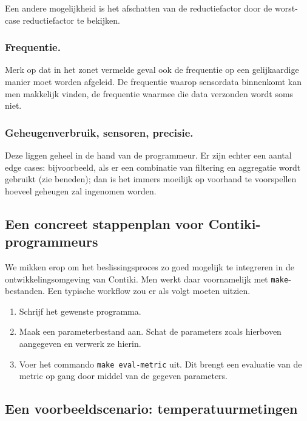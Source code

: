 \documentclass[11pt]{article}
\begin{document}
Een andere mogelijkheid is het afschatten van de reductiefactor door de
worst-case reductiefactor te bekijken.

\subsubsection{Frequentie.} Merk op dat in het zonet vermelde geval ook de
frequentie op een gelijkaardige manier moet worden afgeleid. De frequentie
waarop sensordata binnenkomt kan men makkelijk vinden, de frequentie waarmee die
data verzonden wordt soms niet. 

\subsubsection{Geheugenverbruik, sensoren, precisie.} Deze liggen geheel in de
hand van de programmeur. Er zijn echter een aantal edge cases: bijvoorbeeld, als
er een combinatie van filtering en aggregatie wordt gebruikt (zie beneden); dan
is het immers moeilijk op voorhand te voorspellen hoeveel geheugen zal ingenomen
worden.

\subsection{Een concreet stappenplan voor Contiki-programmeurs}
We mikken erop om het beslissingsproces zo goed mogelijk te integreren in
de ontwikkelingsomgeving van Contiki. Men werkt daar voornamelijk met
\texttt{make}-bestanden. Een typische workflow zou er als volgt moeten uitzien.

\begin{enumerate}
\item Schrijf het gewenste programma.
\item Maak een parameterbestand aan. Schat de parameters zoals hierboven
aangegeven en verwerk ze hierin.
\item Voer het commando \texttt{make eval-metric} uit. Dit brengt een evaluatie
van de metric op gang door middel van de gegeven parameters.
\end{enumerate}

\subsection{Een voorbeeldscenario: temperatuurmetingen}
\end{document}
